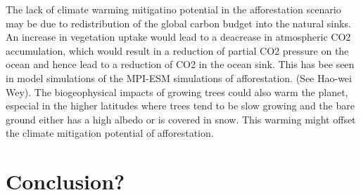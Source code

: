 \documentclass[]{article}
\begin{document}
\begin{itemize}
    \itemize The lack of climate warming mitigatino potential in the afforestation scenario may be due to redistribution of the global carbon budget into the natural sinks.
        An increase in vegetation uptake would lead to a deacrease in atmospheric CO2 accumulation, which would result in a reduction of partial CO2 pressure on the ocean and hence lead to a reduction of CO2 in the ocean sink.
    \itemize This has bee seen in model simulations of the MPI-ESM simulations of afforestation. (See Hao-wei Wey).
    \itemize The biogeophysical impacts of growing trees could also warm the planet, especial in the higher latitudes where trees tend to be slow growing and the bare ground either has a high albedo or is covered in snow. This warming might offset the climate mitigation potential of afforestation.
\end{itemize}

\section{Conclusion?}

\printbibliography
\end{document}
